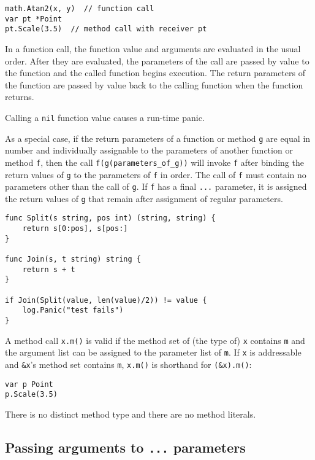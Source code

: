 \begin{Verbatim}[frame=single]
math.Atan2(x, y)  // function call
var pt *Point
pt.Scale(3.5)  // method call with receiver pt
\end{Verbatim}

In a function call, the function value and arguments are evaluated in
the usual order. After they are
evaluated, the parameters of the call are passed by value to the
function and the called function begins execution. The return parameters
of the function are passed by value back to the calling function when
the function returns.

Calling a \texttt{nil} function value causes a
run-time panic.

As a special case, if the return parameters of a function or method
\texttt{g} are equal in number and individually assignable to the
parameters of another function or method \texttt{f}, then the call
\texttt{f(g(parameters\_of\_g))} will invoke \texttt{f} after binding
the return values of \texttt{g} to the parameters of \texttt{f} in
order. The call of \texttt{f} must contain no parameters other than the
call of \texttt{g}. If \texttt{f} has a final \texttt{...} parameter, it
is assigned the return values of \texttt{g} that remain after assignment
of regular parameters.

\begin{Verbatim}[frame=single]
func Split(s string, pos int) (string, string) {
    return s[0:pos], s[pos:]
}

func Join(s, t string) string {
    return s + t
}

if Join(Split(value, len(value)/2)) != value {
    log.Panic("test fails")
}
\end{Verbatim}

A method call \texttt{x.m()} is valid if the
method set of (the type of) \texttt{x} contains
\texttt{m} and the argument list can be assigned to the parameter list
of \texttt{m}. If \texttt{x} is
addressable and \texttt{\&x}'s method set
contains \texttt{m}, \texttt{x.m()} is shorthand for \texttt{(\&x).m()}:

\begin{Verbatim}[frame=single]
var p Point
p.Scale(3.5)
\end{Verbatim}

There is no distinct method type and there are no method literals.

\subsection*{Passing arguments to \texttt{...} parameters}

